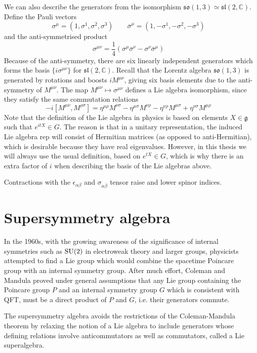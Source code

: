 We can also describe the
generators from the isomorphism $\mathfrak{so}(1,3) \simeq
\mathfrak{sl}(2,\mathbb{C})$. Define the Pauli vectors
\[
	\sigma^{\mu} = (1,\sigma^1,\sigma^2,\sigma^3)
\qquad
	\overline{\sigma}^{\mu} = (1,-\sigma^1,-\sigma^2,-\sigma^3)
\] 
and the anti-symmetrised product 
\[
	\sigma^{\mu\nu} = \frac{1}{4}(\sigma^\mu \overline{\sigma}^\nu - \sigma^\nu
	\overline{\sigma}^\mu)
\]
Because of the anti-symmetry, there are six linearly independent generators
which forms the basis $\{i\sigma^{\mu\nu}\}$ for $\mathfrak{sl}(2,\mathbb{C})$. 
Recall that the Lorentz algebra $\mathfrak{so}(1,3)$ is generated by rotations and boosts 
$iM^{\mu\nu}$, giving six basis elements due to the anti-symmetry of $M^{\mu\nu}$. 
The map $M^{\mu\nu} \mapsto \sigma^{\mu\nu}$ defines a Lie algebra 
isomorphism, since they satisfy the same commutation relations
\[
-i[M^{\mu\nu}, M^{\rho\sigma}] = \eta^{\mu\rho}M^{\nu\sigma} -
	\eta^{\mu\sigma}M^{\nu\rho} - \eta^{\nu\rho}M^{\mu\sigma} +
	\eta^{\nu\sigma}M^{\mu\rho}
\] 
Note that the definition of the Lie algebra in physics is based
on elements $X\in \mathfrak{g}$ such that  $e^{itX}\in G$. The reason is that
in a unitary representation, the induced Lie algebra rep will consist of
Hermitian matrices (as opposed to anti-Hermitian), which is desirable because
they have real eigenvalues. However, in this thesis we
will always use the usual definition, based on $e^{tX}\in G$, which is why there
is an extra factor of $i$ when describing the basis of the Lie algebras above.

Contractions with the $\epsilon_{\alpha\beta}$ and 
$\sigma_{\dot{\alpha}\dot{\beta}}$ tensor raise and lower spinor indices.


\section{Supersymmetry algebra}
In the 1960s, with the growing awareness of the significance of internal
symmetries such as $\operatorname{SU}(2)$ in electroweak theory and larger groups,
physicists attempted to find a Lie group which would combine the spacetime
Poincare group with an internal symmetry group. After much effort, Coleman and
Mandula proved under general assumptions that any Lie group containing the
Poincare group $P$ and an internal symmetry group $G$ which is consistent with
QFT, must be a direct product of $P$ and  $G$, i.e. their generators commute.

The supersymmetry algebra avoids the restrictions of the Coleman-Mandula theorem
by relaxing the notion of a Lie algebra to include generators whose
defining relations involve anticommutators as well as commutators, called
a Lie superalgebra. 

